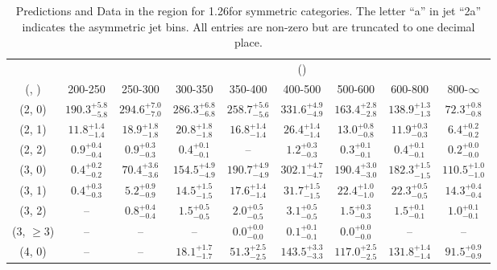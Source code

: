 \begin{table}[h!]
\tiny
\centering
\caption{Predictions and Data in the \mj region for 1.26\ifb for symmetric categories. The letter ``a'' in jet \eg ``2a''  indicates the asymmetric jet bins. All entries are non-zero but are truncated to one decimal place.\label{tab:yieldsseppost_mu_wjetstolnuht_sym}}
\begin{tabular}
{ccccccccc}
	\hline\hline
&	& \multicolumn{8}{c}{\scalht (\gev)} \\ 
	 (\njet,  \nb) & 200-250 & 250-300 & 300-350 & 350-400 & 400-500 & 500-600 & 600-800 & 800-$\infty$ \\ [0.8ex] 
\hline
	(2, 0) & $190.3^{+ 5.8 }_{- 5.8 }$ & $294.6^{+ 7.0 }_{- 7.0 }$ & $286.3^{+ 6.8 }_{- 6.8 }$ & $258.7^{+ 5.6 }_{- 5.6 }$ & $331.6^{+ 4.9 }_{- 4.9 }$ & $163.4^{+ 2.8 }_{- 2.8 }$ & $138.9^{+ 1.3 }_{- 1.3 }$ & $72.3^{+ 0.8 }_{- 0.8 }$ \\[0.5ex] 
	(2, 1) & $11.8^{+ 1.4 }_{- 1.4 }$ & $18.9^{+ 1.8 }_{- 1.8 }$ & $20.8^{+ 1.8 }_{- 1.8 }$ & $16.8^{+ 1.4 }_{- 1.4 }$ & $26.4^{+ 1.4 }_{- 1.4 }$ & $13.0^{+ 0.8 }_{- 0.8 }$ & $11.9^{+ 0.3 }_{- 0.3 }$ & $6.4^{+ 0.2 }_{- 0.2 }$ \\[0.5ex] 
	(2, 2) & $0.9^{+ 0.4 }_{- 0.4 }$ & $0.9^{+ 0.3 }_{- 0.3 }$ & $0.4^{+ 0.1 }_{- 0.1 }$ & -- & $1.2^{+ 0.3 }_{- 0.3 }$ & $0.3^{+ 0.1 }_{- 0.1 }$ & $0.4^{+ 0.1 }_{- 0.1 }$ & $0.2^{+ 0.0 }_{- 0.0 }$ \\[0.5ex] 
	(3, 0) & $0.4^{+ 0.2 }_{- 0.2 }$ & $70.4^{+ 3.6 }_{- 3.6 }$ & $154.5^{+ 4.9 }_{- 4.9 }$ & $190.7^{+ 4.9 }_{- 4.9 }$ & $302.1^{+ 4.7 }_{- 4.7 }$ & $190.4^{+ 3.0 }_{- 3.0 }$ & $182.3^{+ 1.5 }_{- 1.5 }$ & $110.5^{+ 1.0 }_{- 1.0 }$ \\[0.5ex] 
	(3, 1) & $0.4^{+ 0.3 }_{- 0.3 }$ & $5.2^{+ 0.9 }_{- 0.9 }$ & $14.5^{+ 1.5 }_{- 1.5 }$ & $17.6^{+ 1.4 }_{- 1.4 }$ & $31.7^{+ 1.5 }_{- 1.5 }$ & $22.4^{+ 1.0 }_{- 1.0 }$ & $22.3^{+ 0.5 }_{- 0.5 }$ & $14.3^{+ 0.4 }_{- 0.4 }$ \\[0.5ex] 
	(3, 2) & -- & $0.8^{+ 0.4 }_{- 0.4 }$ & $1.5^{+ 0.5 }_{- 0.5 }$ & $2.0^{+ 0.5 }_{- 0.5 }$ & $3.1^{+ 0.5 }_{- 0.5 }$ & $1.5^{+ 0.3 }_{- 0.3 }$ & $1.5^{+ 0.1 }_{- 0.1 }$ & $1.0^{+ 0.1 }_{- 0.1 }$ \\[0.5ex] 
	(3, $\ge3$) & -- & -- & -- & $0.0^{+ 0.0 }_{- 0.0 }$ & $0.1^{+ 0.1 }_{- 0.1 }$ & $0.0^{+ 0.0 }_{- 0.0 }$ & -- & -- \\[0.5ex] 
	(4, 0) & -- & -- & $18.1^{+ 1.7 }_{- 1.7 }$ & $51.3^{+ 2.5 }_{- 2.5 }$ & $143.5^{+ 3.3 }_{- 3.3 }$ & $117.0^{+ 2.5 }_{- 2.5 }$ & $131.8^{+ 1.4 }_{- 1.4 }$ & $91.5^{+ 0.9 }_{- 0.9 }$ \\[0.5ex] 

\end{tabular}
\end{table}
